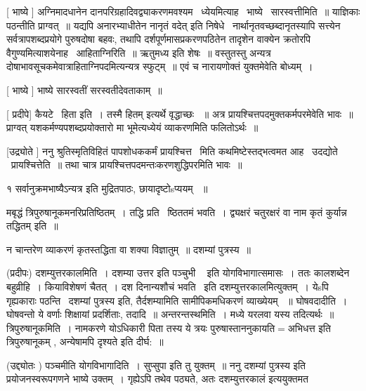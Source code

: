 \documentclass[11pt, openany]{book}
\begin{document}
 [ भाष्ये ] अग्निमादधानेन दानपरिग्रहादिवद्व्याकरणमवश्यम \textendash\ 
ध्येयमित्याह \textendash\ भाष्ये \textendash\ सारस्वत्तीमिति~॥ याज्ञिकाः पठन्तीति प्राग्वत्~॥
यद्यपि अनारभ्याधीतेन {\qt नानृतं वदेत् इति निषेधे} \textendash\ 
नार्थानृतवच्छब्दानृतस्यापि सत्त्येन सर्वत्रापशब्दप्रयोगे पुरुषदोषा बहवः,
तथापि दर्शपूर्णमासप्रकरणपठितेन तादृशेन वाक्येन क्रतोरपि
वैगुण्यमित्याशयेनाह \textendash\ आहिताग्निरिति~॥ ऋतुमध्य इति शेषः~॥ वस्तुतस्तु
अन्यत्र दोषाभावसूचकमेवात्राहिताग्निपदमित्यन्यत्र स्फुट्म्~॥ एवं च
नारायणोक्तं युक्तमेवेति बोध्यम्~। 

 [ भाष्ये ] भाष्ये सारस्वतीं सरस्वतीदेवताकाम्~॥ 

 [ प्रदीपे] कैयटे \textendash\ हिता इति~। {\qt तस्मै हितम्} इत्यर्थे वृद्धाच्छः
~॥ अत्र प्रायश्चित्तपदमुक्तकर्मपरमेवेति भावः~॥ प्राग्वत्
यशकर्मण्यपशब्दप्रयोक्तारो मा भूमेत्यध्येयं व्याकरणमिति फलितोऽर्थः~॥ 

 [उद्र्योते ] ननु श्रुतिस्मृतिविहितं पापशोधककर्मं प्रायश्चित्त \textendash\ 
मिति कथमिष्टेस्तद्भत्वमत आह \textendash\ उदद्योते \textendash\ प्रायश्चित्तेति~॥ तथा चात्र
प्रायश्चित्तपदमन्तःकरणशुद्धिपरमिति भावः~॥ 



१ {\qt सर्वानुक्रमभाष्यैऽन्यत्र} इति मुद्रितपाठः, छायादृष्टोsप्ययम्
~॥ 





मबृद्धं त्रिपुरुषानूकमनरिप्रतिष्ठितम्~। तद्धि प्रति \textendash\ ष्ठिततमं भवति~। 
{\qt द्व्यक्षरं चतुरक्षरं वा नाम कृतं कुर्यान्न तद्धितम्} इति~॥ 

 न चान्तरेण व्याकरणं कृतस्तद्धिता वा शक्या विज्ञातुम्~॥ दशम्यां
पुत्रस्य~॥ 

 (प्रदीपः) दशम्युत्तरकालमिति~। दशम्या उत्तर इति {\qt पञ्चुभी \textendash\ } इति
योगविभागात्समासः~। ततः कालशब्देन बहुव्रीहि~। कियाविशेषणं चैतत्~। दश
दिनान्यशौचं भवति \textendash\ इति दशम्युत्तरकालमित्युक्तम्~। येsपि गृह्यकाराः
पठन्ति \textendash\ {\qt दशम्यां पुत्रस्य} इति, तैर्दशम्यामिति सामीपिकमधिकरणं व्याख्येयम्
~॥ घोषवदादीति~। घोषवन्तो ये वर्णाः शिक्षायां प्रदर्शिताः, तदादि~॥
अन्तरन्तस्थमिति~। मध्ये यरलवा यस्य तदित्यर्थः~॥ त्रिपुरुषानूकमिति~। 
नामकरणे योऽधिकारी पिता तस्य ये त्रयः पुरुषास्ताननुकायति$=$अभिधत्त
इति त्रिपुरुषानूकम् , {\qt अन्येषामपि दृश्यते} इति दीर्घ:~॥ 

 (उद्द्योतः ) पञ्चमीति योगविभागादिति~। {\qt सुप्सुपा} इति तु युक्तम्~॥
ननु {\qt दशम्यां पुत्रस्य इति प्रयोजनस्वरूपगणने भाष्ये उक्तम्~।} गृह्येऽपि
तथेव पठ्यते, अतः {\qt दशम्युत्तरकालं इत्ययुक्तमत}
\end{document}
